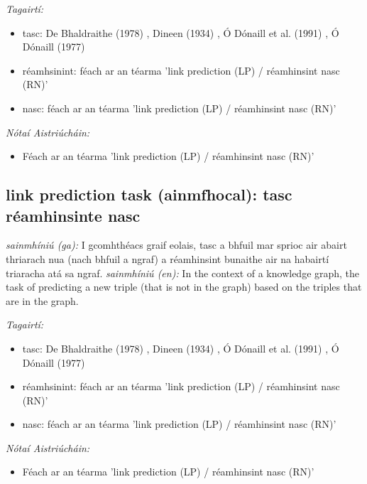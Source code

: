 \documentclass{article}
\begin{document}
 \noindent \textit{Tagairtí:}
\begin{itemize}
	\item tasc: De Bhaldraithe (1978) \cite{de-bhaldraithe}, Dineen (1934) \cite{dineen}, Ó Dónaill et al. (1991) \cite{focloir-beag}, Ó Dónaill (1977) \cite{odonaill}
	\item réamhsinint: féach ar an téarma 'link prediction (LP) / réamhinsint nasc (RN)'
	\item nasc: féach ar an téarma 'link prediction (LP) / réamhinsint nasc (RN)'
\end{itemize}

 \noindent \textit{Nótaí Aistriúcháin:}
\begin{itemize}
	\item Féach ar an téarma 'link prediction (LP) / réamhinsint nasc (RN)'
\end{itemize}


\subsection*{link prediction task (ainmfhocal): tasc réamhinsinte nasc} 
 \noindent \textit{sainmhíniú (ga):} I gcomhthéacs graif eolais, tasc a bhfuil mar sprioc air abairt thriarach nua (nach bhfuil a ngraf) a réamhinsint bunaithe air na habairtí triaracha atá sa ngraf.
\newline\newline
 \noindent \textit{sainmhíniú (en):} In the context of a knowledge graph, the task of predicting a new triple (that is not in the graph) based on the triples that are in the graph.
\newline

 \noindent \textit{Tagairtí:}
\begin{itemize}
	\item tasc: De Bhaldraithe (1978) \cite{de-bhaldraithe}, Dineen (1934) \cite{dineen}, Ó Dónaill et al. (1991) \cite{focloir-beag}, Ó Dónaill (1977) \cite{odonaill}
	\item réamhsinint: féach ar an téarma 'link prediction (LP) / réamhinsint nasc (RN)'
	\item nasc: féach ar an téarma 'link prediction (LP) / réamhinsint nasc (RN)'
\end{itemize}

 \noindent \textit{Nótaí Aistriúcháin:}
\begin{itemize}
	\item Féach ar an téarma 'link prediction (LP) / réamhinsint nasc (RN)'
\end{itemize}
\end{document}
